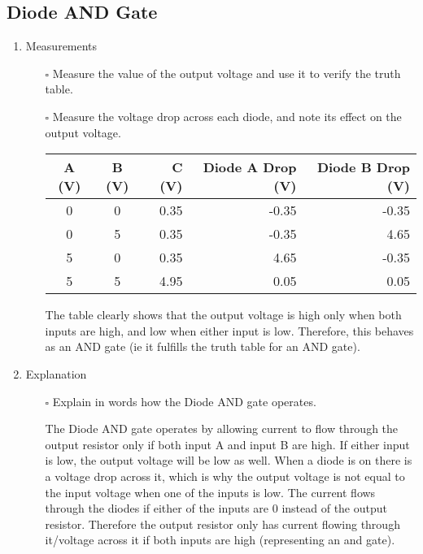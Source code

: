\documentclass[12pt]{article}
\begin{document}
\subsection{Diode AND Gate}


\begin{enumerate}
\item Measurements
\begin{itemize}
    \item[$\square$] Measure the value of the output voltage and use it to verify the truth table.


    
    \item[$\square$] Measure the voltage drop across each diode, and note its effect on the output voltage.

\begin{tabular}{|c|c|r|r|r|}
\hline
A (V) & B (V) & C (V)& Diode A Drop (V)& Diode B Drop (V)\\
\hline
0 & 0 & 0.35 & -0.35 & -0.35\\
0 & 5 & 0.35 & -0.35 & 4.65 \\
5 & 0 & 0.35 & 4.65 & -0.35 \\
5 & 5 & 4.95 & 0.05 & 0.05 \\
\hline
\end{tabular}

The table clearly shows that the output voltage is high only when both inputs are high, and low when either input is low.
Therefore, this behaves as an AND gate (ie it fulfills the truth table for an AND gate).

    
\end{itemize}
\item Explanation
\begin{itemize}
    \item[$\square$] Explain in words how the Diode AND gate operates.

    The Diode AND gate operates by allowing current to flow through the output resistor only if both input A and input B are high.
    If either input is low, the output voltage will be low as well.
    When a diode is on there is a voltage drop across it, which is why the output voltage is not equal to the input voltage when one of the inputs is low.
    The current flows through the diodes if either of the inputs are 0 instead of the output resistor.
    Therefore the output resistor only has current flowing through it/voltage across it if both inputs are high (representing an and gate).

    
\end{itemize}
\end{enumerate}
\end{document}
